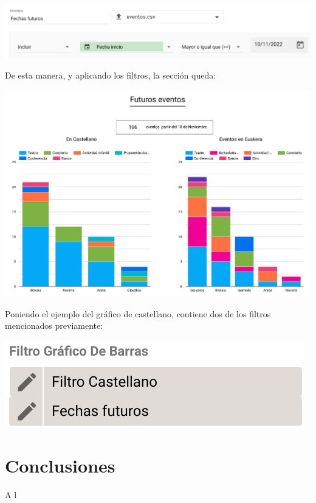 \documentclass{\ClassPath/viu-tfm-template}
\begin{document}
\begin{center}
    \includegraphics[frame,width=0.9\linewidth]{img/futuro.png}
\end{center}

De esta manera, y aplicando los filtros, la sección queda:

\begin{center}
    \includegraphics[frame,width=0.9\linewidth]{img/futuro2.png}
\end{center}

Poniendo el ejemplo del gráfico de castellano, contiene dos de los filtros mencionados previamente:

\begin{center}
    \includegraphics[frame,width=0.4\linewidth]{img/filtros.png}
\end{center}


\chapter{Conclusiones}

A l
\end{document}

